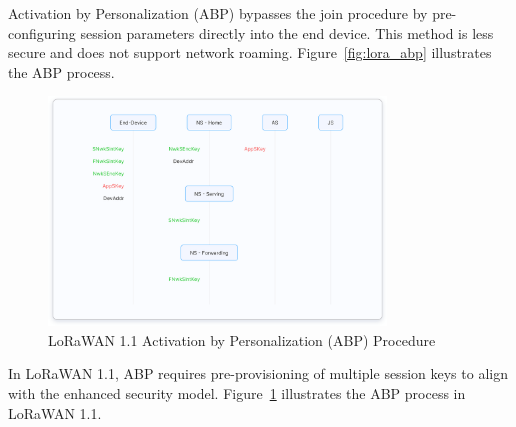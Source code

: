 Activation by Personalization (ABP) bypasses the join procedure by pre-configuring session parameters directly into the end device. This method is less secure and does not support network roaming.
Figure~\ref{fig:lora_abp} illustrates the ABP process.

\begin{figure}
    \centering
    \includegraphics[width=0.8\textwidth]{figures/abp-1.1.png}
    \caption{LoRaWAN 1.1 Activation by Personalization (ABP) Procedure}
    \label{fig:lora_abp_1.1}
\end{figure}
In LoRaWAN 1.1, ABP requires pre-provisioning of multiple session keys to align with the enhanced security model.
Figure~\ref{fig:lora_abp_1.1} illustrates the ABP process in LoRaWAN 1.1.

